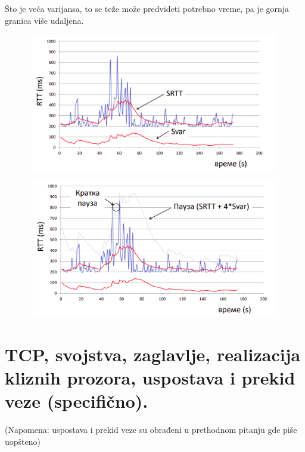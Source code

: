 \documentclass[a4paper]{article}
\begin{document}
        Što je veća varijansa, to se teže može predvideti potrebno vreme, pa je gornja granica
        više udaljena.
        \begin{figure}[H]
            \begin{center}
                \includegraphics[width=120mm,height=60mm]{Slike/tcp_retransmisija3.png}
            \end{center}
        \end{figure}
        \begin{figure}[H]
            \begin{center}
                \includegraphics[width=120mm,height=60mm]{Slike/tcp_retransmisija4.png}
            \end{center}
        \end{figure}

\section{TCP, svojstva, zaglavlje, realizacija kliznih prozora, uspostava i prekid veze (specifično). }
    (Napomena: uspostava i prekid veze su obrađeni u prethodnom pitanju gde piše uopšteno)\\
\end{document}
